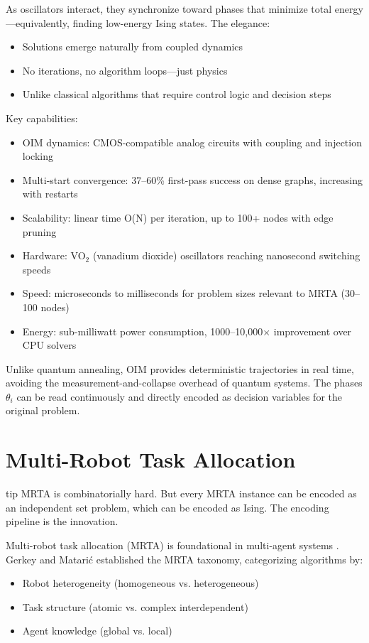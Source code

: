 As oscillators interact, they synchronize toward phases that minimize total energy---equivalently, finding low-energy Ising states. The elegance:
\begin{itemize}
\item Solutions emerge naturally from coupled dynamics
\item No iterations, no algorithm loops---just physics
\item Unlike classical algorithms that require control logic and decision steps
\end{itemize}

Key capabilities:
\begin{itemize}
\item OIM dynamics: CMOS-compatible analog circuits with coupling and injection locking \cite{Bifrost2021}
\item Multi-start convergence: 37--60\% first-pass success on dense graphs, increasing with restarts
\item Scalability: linear time O(N) per iteration, up to 100+ nodes with edge pruning \cite{Wang2019}
\item Hardware: VO$_2$ (vanadium dioxide) oscillators reaching nanosecond switching speeds \cite{Cederberg2012}
\item Speed: microseconds to milliseconds for problem sizes relevant to MRTA (30--100 nodes)
\item Energy: sub-milliwatt power consumption, 1000--10,000$\times$ improvement over CPU solvers
\end{itemize}

Unlike quantum annealing, OIM provides deterministic trajectories in real time, avoiding the measurement-and-collapse overhead of quantum systems. The phases $\theta_i$ can be read continuously and directly encoded as decision variables for the original problem.

\section{Multi-Robot Task Allocation}
\begin{block}{tip}
MRTA is combinatorially hard. But every MRTA instance can be encoded as an independent set problem, which can be encoded as Ising. The encoding pipeline is the innovation.
\end{block}


Multi-robot task allocation (MRTA) is foundational in multi-agent systems \cite{Khamis2015}. Gerkey and Matarić \cite{Gerkey2004} established the MRTA taxonomy, categorizing algorithms by:
\begin{itemize}
\item Robot heterogeneity (homogeneous vs. heterogeneous)
\item Task structure (atomic vs. complex interdependent)
\item Agent knowledge (global vs. local)
\end{itemize}

